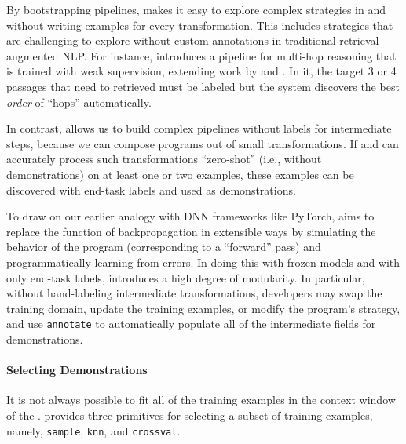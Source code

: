 By bootstrapping pipelines, \demonstrate makes it easy to explore complex strategies in \search and \predict without writing examples for every transformation. This includes strategies that are challenging to explore without custom annotations in traditional retrieval-augmented NLP. For instance, \citet{khattab2021baleen} introduces a pipeline for multi-hop reasoning that is trained with weak supervision, extending work by \citet{lee2019latent} and \citet{khattab2021relevance}. In it, the target 3 or 4 passages that need to retrieved must be labeled but the system discovers the best \textit{order} of ``hops'' automatically.

In contrast, \DSP allows us to build complex pipelines without labels for intermediate steps, because we can compose programs out of small transformations. If \LM{} and \RM{} can accurately process such transformations ``zero-shot'' (i.e., without demonstrations) on at least one or two examples, these examples can be discovered with end-task labels and used as demonstrations.


To draw on our earlier analogy with DNN frameworks like PyTorch, \demonstrate aims to replace the function of backpropagation in extensible ways by simulating the behavior of the program (corresponding to a ``forward'' pass) and programmatically learning from errors. In doing this with frozen models and with only end-task labels, \demonstrate introduces a high degree of modularity. In particular, without hand-labeling intermediate transformations, developers may swap the training domain, update the training examples, or modify the program's strategy, and use \texttt{annotate} to automatically populate all of the intermediate fields for demonstrations.















\vspace{-2mm}
\paragraph{Selecting Demonstrations} It is not always possible to fit all of the training examples in the context window of the \LM{}. \DSP provides three primitives for selecting a subset of training examples, namely, \texttt{sample}, \texttt{knn}, and \texttt{crossval}.

